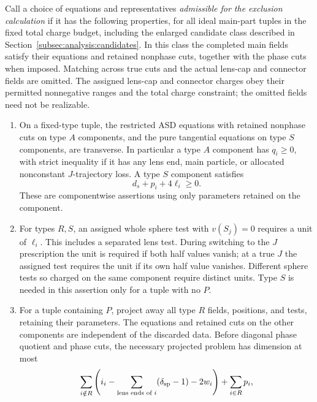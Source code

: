 \begin{definition}\label{def:indices:analytic-hypotheses}
Call a choice of equations and representatives \emph{admissible for the
exclusion calculation} if it has the following properties, for all ideal
main-part tuples in the fixed total charge budget, including the enlarged
candidate class described in Section~\ref{subsec:analysis:candidates}.
In this class the completed main fields satisfy their equations and
retained nonphase cuts, together with the phase cuts when imposed.
Matching across true cuts and the actual lens-cap and connector fields are
omitted.  The assigned lens-cap and connector charges obey their permitted
nonnegative ranges and the total charge constraint; the omitted fields
need not be realizable.
\begin{enumerate}[label=(\roman*)]
\item On a fixed-type tuple, the restricted ASD equations with retained
nonphase cuts on type $A$ components, and the pure tangential equations
on type $S$ components, are transverse.  In particular a type $A$
component has $q_i\ge0$, with
strict inequality if it has any lens end, main particle, or allocated
nonconstant $J$-trajectory loss.  A type $S$ component satisfies
\begin{equation}\label{eq:indices:tangential-bound}
 d_s+p_i+4\ell_i\ge0.
\end{equation}
These are componentwise assertions using only parameters retained on the
component.
\item For types $R,S$, an assigned whole sphere test with $v(S_j)=0$
requires a unit of $\ell_i$.  This includes a separated lens test.  During
switching to the $J$ prescription the unit is required if both half
values vanish; at a true $J$ the assigned test requires the unit if its
own half value vanishes.  Different sphere tests so charged on the same
component require distinct units.  Type $S$ is needed in this assertion
only for a tuple with no $P$.
\item For a tuple containing $P$, project away all type $R$ fields,
positions, and tests, retaining their parameters.  The equations and
retained cuts on the other components are independent of the discarded
data.  Before diagonal phase quotient and phase cuts, the necessary
projected problem has dimension at most
\begin{equation}\label{eq:indices:projection-input}
 \sum_{i\notin R}
 \left(i_i-\sum_{\text{lens ends of }i}(\delta_{\rm sp}-1)-2w_i\right)
       +\sum_{i\in R}p_i,
\end{equation}

\end{enumerate}
\end{definition}
